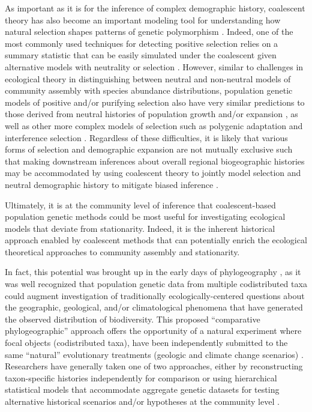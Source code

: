 \documentclass[12pt]{article}
\begin{document}
As important as it is for the inference of complex demographic
history, coalescent theory has also become an important modeling tool
for understanding how natural selection shapes patterns of genetic
polymorphism \cite{Kim2002-ex, Kern2016-ap, Ewing2016-bm}. Indeed, one
of the most commonly used techniques for detecting positive selection
relies on a summary statistic that can be easily simulated under the
coalescent given alternative models with neutrality or selection
\cite{Tajima1989-mc}. However, similar to challenges in ecological
theory in distinguishing between neutral and non-neutral models of
community assembly with species abundance distributions, population
genetic models of positive and/or purifying selection also have very
similar predictions to those derived from neutral histories of
population growth and/or expansion \cite{Freedman2016-yx,
  Barton1998-xs, Barton2000-gr, Jensen2005-ef, Schrider2016-cw}, as
well as other more complex models of selection such as polygenic
adaptation and interference selection \cite{Stephan2016-lf,
  Good2014-fq}. Regardless of these difficulties, it is likely that
various forms of selection and demographic expansion are not mutually
exclusive such that making downstream inferences about overall
regional biogeographic histories may be accommodated by using
coalescent theory to jointly model selection and neutral demographic
history to mitigate biased inference \cite{Kern2016-ap, Ewing2016-bm,
  Phung2016-uo, Roux2016-hz}.

Ultimately, it is at the community level of inference that
coalescent-based population genetic methods could be most useful for
investigating ecological models that deviate from
stationarity. Indeed, it is the inherent historical approach enabled
by coalescent methods that can potentially enrich the ecological
theoretical approaches to community assembly and stationarity.

In fact, this potential was brought up in the early days of
phylogeography \cite{Avise1987-vx,Avise1998-th}, as it was well
recognized that population genetic data from multiple codistributed
taxa could augment investigation of traditionally
ecologically-centered questions about the geographic, geological,
and/or climatological phenomena that have generated the observed
distribution of biodiversity. This proposed ``comparative
phylogeographic'' approach offers the opportunity of a natural
experiment where focal objects (codistributed taxa), have been
independently submitted to the same ``natural'' evolutionary
treatments (geologic and climate change scenarios)
\cite{Arbogast2001-jx}. Researchers have generally taken one of two
approaches, either by reconstructing taxon-specific histories
independently for comparison \cite{Smith2012-db, Carstens2005-uf,
  Hickerson2005-ek} or using hierarchical statistical models that
accommodate aggregate genetic datasets for testing alternative
historical scenarios and/or hypotheses at the community level
\cite{Hickerson2006-uf, Carstens2016-mc, Chan2014-nq, Satler2016-lb}.
\end{document}
